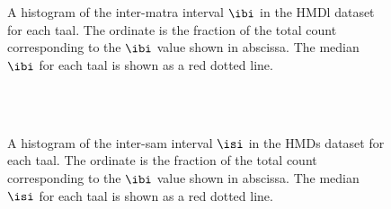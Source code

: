 %
\begin{figure}[t]
\centering
{} \hspace{0.5cm} 
 \\ 
 \hspace{0.5cm} 
 \\ 
\caption[Histogram of $\protect\ibi$ in the \acrshort{HMDl} dataset]{A histogram of the inter-\gls{matra} interval $\protect\ibi$ in the \acrshort{HMDl} dataset for each \gls{taal}. The ordinate is the fraction of the total count corresponding to the $\ibi$ value shown in abscissa. The median $\ibi$ for each \gls{taal} is shown as a red dotted line.}\label{fig:dstats:HMDl:IAI}
\end{figure}
%
\begin{figure}[t]
\centering
{} \hspace{0.5cm} 
 \\ 
 \hspace{0.5cm} 
 \\ 
\caption[Histogram of $\protect\isi$ in the \acrshort{HMDs} dataset]{A histogram of the inter-\gls{sam} interval $\protect\isi$ in the \acrshort{HMDs} dataset for each \gls{taal}. The ordinate is the fraction of the total count corresponding to the $\ibi$ value shown in abscissa. The median $\isi$ for each \gls{taal} is shown as a red dotted line.}\label{fig:dstats:HMDs:ISI}
\end{figure}
%
